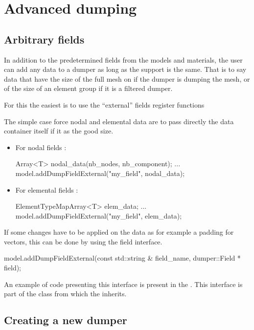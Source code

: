 \section{Advanced dumping}

\subsection{Arbitrary fields}
In addition to the predetermined fields from the models and materials, the user
can add any data to a dumper as long as the support is the same. That is to say
data that have the size of the full mesh on if the dumper is dumping the mesh,
or of the size of an element group if it is a filtered dumper.

For this the easiest is to use the ``external'' fields register functions

The simple case force nodal and elemental data are to pass directly the data
container itself if it as the good size.
\begin{itemize}
\item For nodal fields :
\begin{cpp}
  Array<T> nodal_data(nb_nodes, nb_component);
  ...
  model.addDumpFieldExternal("my_field", nodal_data);
\end{cpp}

\item For elemental fields :
\begin{cpp}
  ElementTypeMapArray<T> elem_data;
  ...
  model.addDumpFieldExternal("my_field", elem_data);
\end{cpp}
\end{itemize}

If some changes have to be applied on the data as for example a padding for
 vectors, this can be done by using the
field interface.

\begin{cpp}
  model.addDumpFieldExternal(const std::string & field_name,
                             dumper::Field * field);
\end{cpp}

An example of code presenting this interface is present in the
. This interface is part of the
 class from which the  inherits.

\subsection{Creating a new dumper}

